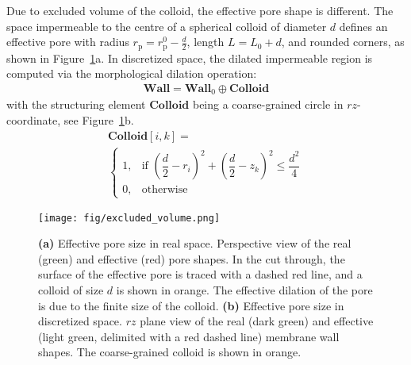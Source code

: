 \documentclass[10pt, a4paper, twocolumn]{article}
\begin{document}
Due to excluded volume of the colloid, the effective pore shape is different.
The space impermeable to the centre of a spherical colloid of diameter $d$ defines an effective pore with radius $r_{\text{p}} = r_{\text{p}}^{0} - \frac{d}{2}$, length $L = L_{0} + d$, and rounded corners, as shown in Figure~\ref{fig:excluded_volume}a.
In discretized space, the dilated impermeable region is computed via the morphological dilation operation:
\begin{eqnarray}
    \textbf{Wall} = \textbf{Wall}_{0} \oplus \textbf{Colloid}
\end{eqnarray}
with the structuring element $\textbf{Colloid}$ being a coarse-grained circle in $rz$-coordinate, see Figure~\ref{fig:excluded_volume}b.
\begin{equation}
    \begin{gathered}
        \textbf{Colloid}[i,k] = \\
        \begin{cases}
                1, & \text{if } \left( \dfrac{d}{2} - r_i\right)^2 + \left( \dfrac{d}{2} - z_k\right)^2 \le \dfrac{d^2}{4} \\[5pt]
                0, & \text{otherwise}
            \end{cases}
    \end{gathered}
\end{equation}

\begin{figure}[]
    \centering
    \texttt{[image: fig/excluded\_volume.png]}
    \caption{
        \textbf{(a)} Effective pore size in real space. Perspective view of the real (green) and effective (red) pore shapes.
        In the cut through, the surface of the effective pore is traced with a dashed red line, and a colloid of size $d$ is shown in orange.
        The effective dilation of the pore is due to the finite size of the colloid.
        \textbf{(b)} Effective pore size in discretized space. $rz$ plane view of the real (dark green) and effective (light green, delimited with a red dashed line) membrane wall shapes.
        The coarse-grained colloid is shown in orange.
        }
    \label{fig:excluded_volume}
\end{figure}
\end{document}
